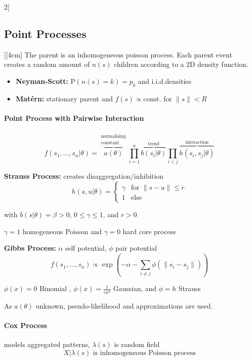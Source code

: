 \documentclass[8pt]{extarticle}
\begin{document}
\begin{multicols}{2}[\subsection{Point Processes}][4cm]
The parent is an inhomogeneous poisson process. Each parent event creates a random amount of $n(s)$ children according to a 2D density function.

\vspace{-0.7em}
\begin{itemize}[itemsep=-0.3em]
\item \textbf{Neyman-Scott:} $\mathrm{P}(n(s)=k)=p_k$ and i.i.d.\@ densities  
\item \textbf{Mat\'{e}rn:} stationary parent and $f(s)\propto \text{const.}$ for $\| s\| <R$
\end{itemize}

\paragraph{Point Process with Pairwise Interaction}

$$f(s_1,...,s_n|\theta) = \overbrace{a(\theta)}^{\substack{\text{normalising} \\ \text{constant}}}\prod_{i=1}^n \overbrace{b(s_i|\theta)}^{\text{trend}}\prod_{i<j}\overbrace{h(s_i,s_j|\theta)}^{\text{interaction}}$$

\textbf{Strauss Process:} creates disaggregation/inhibition
$$h(s,u|\theta)=\begin{cases} \gamma & \text{for } \|s-u\| \leq r \\ 1 & \text{else}\end{cases}$$

with $b(s|\theta)=\beta>0$, $0\leq\gamma\leq1$, and $r>0$

$\gamma=1$ homogeneous Poisson and  $\gamma=0$ hard core process

\vspace{0.5em}

\textbf{Gibbs Process:} $\alpha$ self potential, $\phi$ pair potential 
$$f(s_1,...,s_n)\propto\exp\left(-\alpha-\sum_{i\neq j} \phi (\|s_i-s_j\|)\right)$$

$\phi(x)=0$ Binomial , $\phi(x)=\frac{1}{\tau x^2}$ Gaussian, and $\phi=h$ Strauss

\vspace{0.5em}


\noindent As $a( \theta)$ unknown, pseudo-likelihood and approximations are used.

\paragraph{Cox Process} models aggregated patterns, $\lambda(s)$ is random field 
$$X|\lambda(s) \text{ is inhomogeneous Poisson process}$$ 


\end{multicols}
\end{document}
